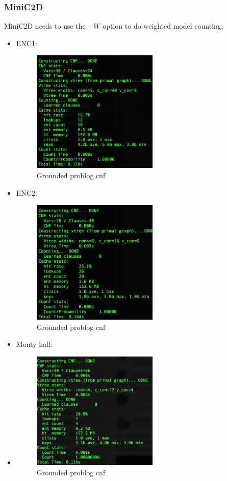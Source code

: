 \subsubsection{MiniC2D}
MiniC2D needs to use the $-W$ option to do weighted model counting.
\begin{itemize}
	\item ENC1:
\begin{figure}[H]
  \includegraphics[width=6cm]{minic2d-ENC1.png}
  \caption{Grounded problog cnf}
\end{figure}
	\item ENC2:
	\begin{figure}[H]
  \includegraphics[width=6cm]{minic2d-ENC2.png}
  \caption{Grounded problog cnf}
\end{figure}
	\item Monty hall:
	\item 	\begin{figure}[H]
  \includegraphics[width=6cm]{Monty-minic2d}
  \caption{Grounded problog cnf}
\end{figure}
\end{itemize}


